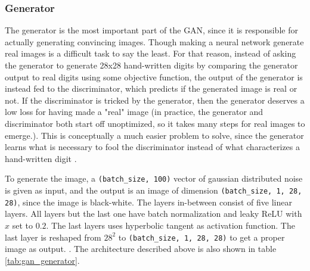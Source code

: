 \documentclass[12pt, fleqn, titlepage]{article}
\begin{document}
\subsubsection{Generator}
The generator is the most important part of the GAN, since it is responsible for actually generating convincing images. Though making a neural network generate real images is a difficult task to say the least. For that reason, instead of asking the generator to generate 28x28 hand-written digits by comparing the generator output to real digits using some objective function, the output of the generator is instead fed to the discriminator, which predicts if the generated image is real or not. If the discriminator is tricked by the generator, then the generator deserves a low loss for having made a "real" image (in practice, the generator and discriminator both start off unoptimized, so it takes many steps for real images to emerge.). This is conceptually a much easier problem to solve, since the generator learns what is necessary to fool the discriminator instead of what characterizes a hand-written digit \cite{developers.google_generator}.

To generate the image, a \texttt{(batch\_size, 100)} vector of gaussian distributed noise is given as input, and the output is an image of dimension \texttt{(batch\_size, 1, 28, 28)}, since the image is black-white. The layers in-between consist of five linear layers. All layers but the last one have batch normalization and leaky ReLU with $x$ set to $0.2$. The last layers uses hyperbolic tangent as activation function. The last layer is reshaped from $28^2$ to \texttt{(batch\_size, 1, 28, 28)} to get a proper image as output. \cite{pathmind_gen_disc_architecture}. The architecture described above is also shown in table \ref{tab:gan_generator}.
\end{document}
